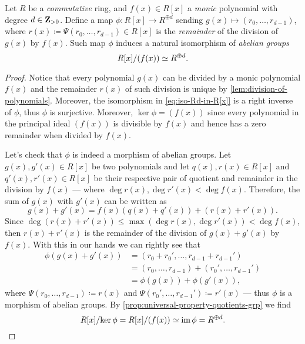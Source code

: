 \begin{proposition}
\label{prop:isomorphism-ring-quotient-by-monic-degree-d}
Let \(R\) be a \emph{commutative} ring, and \(f(x) \in R[x]\) a \emph{monic}
polynomial with degree \(d \in \mathbf{Z}_{> 0}\). Define a map
\(\phi: R[x] \to R^{\oplus d}\) sending \(g(x) \mapsto (r_0, \dots, r_{d-1})\),
where \(r(x) \coloneq \Psi(r_0, \dots, r_{d-1}) \in R[x]\) is the
\emph{remainder} of the division of \(g(x)\) by \(f(x)\). Such map \(\phi\)
induces a natural isomorphism of \emph{abelian groups}
\[
R[x]/(f(x)) \simeq R^{\oplus d}.
\]
\end{proposition}

\begin{proof}
Notice that every polynomial \(g(x)\) can be divided by a monic polynomial
\(f(x)\) and the remainder \(r(x)\) of such division is unique by
\cref{lem:division-of-polynomials}. Moreover, the isomorphism in
\cref{eq:iso-Rd-in-R[x]} is a right inverse of \(\phi\), thus \(\phi\) is
surjective. Moreover, \(\ker \phi = (f(x))\) since every polynomial in the
principal ideal \((f(x))\) is divisible by \(f(x)\) and hence has a zero
remainder when divided by \(f(x)\).

Let's check that \(\phi\) is indeed a morphism of abelian groups. Let \(g(x),
g'(x) \in R[x]\) be two polynomials and let \(q(x), r(x) \in R[x]\) and \(q'(x),
r'(x) \in R[x]\) be their respective pair of quotient and remainder in the
division by \(f(x)\) --- where \(\deg r(x), \deg r'(x) < \deg f(x)\). Therefore,
the sum of \(g(x)\) with \(g'(x)\) can be written as
\[
g(x) + g'(x) = f(x) (q(x) + q'(x)) + (r(x) + r'(x)).
\]
Since \(\deg (r(x) + r'(x)) \leq \max(\deg r(x), \deg r'(x)) < \deg f(x)\), then
\(r(x) + r'(x)\) is the remainder of the division of \(g(x) + g'(x)\) by
\(f(x)\). With this in our hands we can rightly see that
\begin{align*}
\phi(g(x) + g'(x))
&= (r_0 + r_0', \dots, r_{d-1} + r_{d-1}') \\
&= (r_0, \dots, r_{d-1}) + (r_0', \dots, r_{d-1}') \\
&=\phi(g(x)) + \phi(g'(x)),
\end{align*}
where \(\Psi(r_0, \dots, r_{d-1}) \coloneq r(x)\) and
\(\Psi(r_0', \dots, r_{d-1}') \coloneq r'(x)\) --- thus \(\phi\) is a morphism
of abelian groups. By \cref{prop:universal-property-quotients-grp} we find
\[
R[x]/{\ker \phi} = R[x]/(f(x)) \simeq \operatorname{im} \phi = R^{\oplus d}.
\]
\end{proof}

